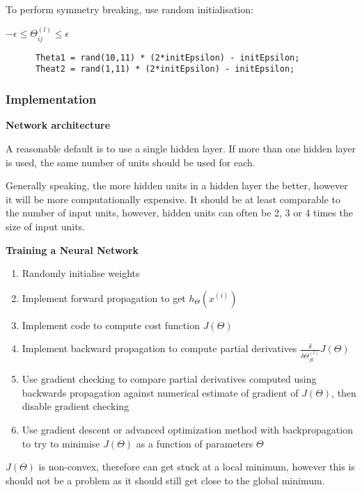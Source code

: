 \documentclass[12pt] {article}
\begin{document}
{      To perform symmetry breaking, use random initialisation:

      $-\epsilon \leq \Theta_{ij}^{(l)} \leq \epsilon$

      \begin{lstlisting}
      Theta1 = rand(10,11) * (2*initEpsilon) - initEpsilon;
      Theat2 = rand(1,11) * (2*initEpsilon) - initEpsilon;
      \end{lstlisting}

    \subsubsection{Implementation}

      \textbf{Network architecture}

      A reasonable default is to use a single hidden layer. If more than one 
      hidden layer is used, the same number of units should be used for each.
      
      Generally speaking, the more hidden units in a hidden layer the better,
      however it will be more computationally expensive. It should be at least
      comparable to the number of input units, however, hidden units can often
      be 2, 3 or 4 times the size of input units. 

      \textbf{Training a Neural Network}
      \vspace{-1em}
      \begin{enumerate}
      \item Randomly initialise weights
      \item Implement forward propagation to get $h_\Theta(x^{(i)})$
      \item Implement code to compute cost function $J(\Theta)$
      \item Implement backward propagation to compute partial derivatives 
            $\frac{\delta}{\delta\Theta_{jk}^{(l)}}J(\Theta)$
      \item Use gradient checking to compare partial derivatives computed
            using backwards propagation against numerical estimate of gradient
            of $J(\Theta)$, then disable gradient checking
      \item Use gradient descent or advanced optimization method with 
            backpropagation to try to minimise $J(\Theta)$ as a function of
            parameters $\Theta$
      \end{enumerate}

      $J(\Theta)$ is non-convex, therefore can get stuck at a local minimum, 
      however this is should not be a problem as it should still get close to
      the global minimum.

}
\end{document}
